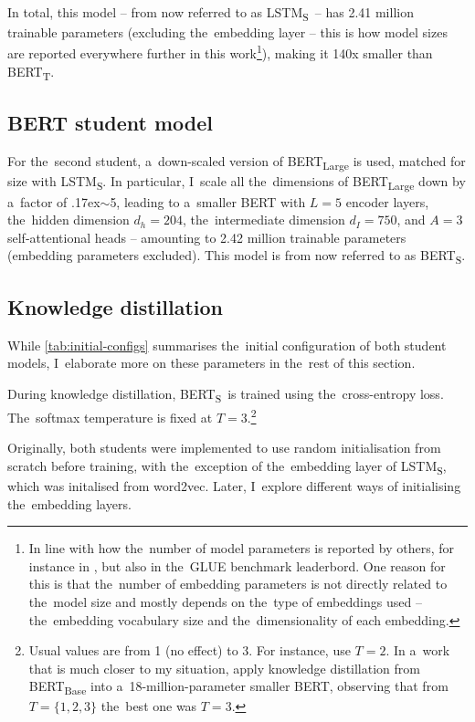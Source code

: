 \documentclass[bsc,frontabs,singlespacing,parskip,deptreport]{infthesis}
\def\mytilde{{\raise.17ex\hbox{$\scriptstyle\sim$}}}
\def\BERTT{BERT\textsubscript{T}}
\def\BERTS{BERT\textsubscript{S}}
\def\LSTMS{LSTM\textsubscript{S}}
\begin{document}
{{{      In total, this model -- from now referred to as \LSTMS~-- has 2.41 million trainable parameters (excluding the~embedding layer -- this is how model sizes are reported everywhere further in this work\footnote{In line with how the~number of model parameters is reported by others, for instance in \citet{Tang_2019b,Tang_2019a}, but also in the~GLUE benchmark leaderbord. One reason for this is that the~number of embedding parameters is not directly related to the~model size and mostly depends on the~type of embeddings used -- the~embedding vocabulary size and the~dimensionality of each embedding.}), making it 140x smaller than \BERTT.
    }

    \subsection{BERT student model}{
      \label{sec:student-bert}
      For the~second student, a~down-scaled version of BERT\textsubscript{Large} is used, matched for size with \LSTMS. In particular, I~scale all the~dimensions of BERT\textsubscript{Large} down by a~factor of \mytilde5, leading to a~smaller BERT with $L=5$ encoder layers, the~hidden dimension $d_h=204$, the~intermediate dimension $d_I=750$, and $A=3$ self-attentional heads -- amounting to 2.42 million trainable parameters (embedding parameters excluded). This model is from now referred to as \BERTS.
    }

    \subsection{Knowledge distillation}{
      While \autoref{tab:initial-configs} summarises the~initial configuration of both student models, I~elaborate more on these parameters in the~rest of this section.

      During knowledge distillation, \BERTS~is trained using the~cross-entropy loss. The~softmax temperature is fixed at $T=3$.\footnote{Usual values are from 1 (no effect) to 3. For instance, \citet{Sanh_2019} use $T=2$. In a~work that is much closer to my situation, \citet{Tsai_2019} apply knowledge distillation from BERT\textsubscript{Base} into a~18-million-parameter smaller BERT, observing that from $T=\{1, 2, 3\}$ the~best one was $T=3$.}
      
      Originally, both students were implemented to use random initialisation from scratch before training, with the~exception of the~embedding layer of \LSTMS, which was initalised from word2vec. Later, I~explore different ways of initialising the~embedding layers.
      
}}}
\end{document}
